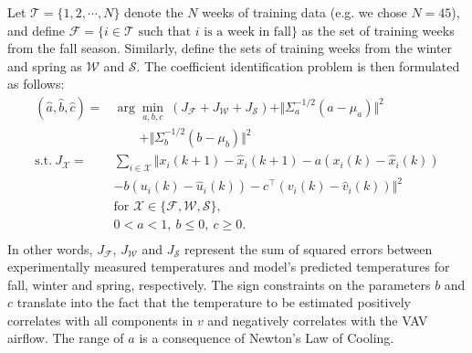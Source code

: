 Let $\mathcal{T} = \{1, 2, \cdots, N\}$ denote the $N$ weeks of training data (e.g. we chose $N = 45$), and define $\mathcal{F} = \{i \in \mathcal{T} \text{ such that $i$ is a week in fall} \}$ as the set of training weeks from the fall season. Similarly, define the sets of training weeks from the winter and spring as $\mathcal{W}$ and $\mathcal{S}$.
The coefficient identification problem is then formulated as follows:
\begin{equation}\label{eq:data_opt}
\begin{aligned}
(\hat{a}, \hat{b} , \hat{c}) = &\arg\min_{a, b, c}~\left(J_\mathcal{F} + J_\mathcal{W} + J_\mathcal{S}\right) + \Vert \Sigma_a^{-1/2} (a - \mu_a) \Vert^2\\
& \quad\quad + \Vert \Sigma_b^{-1/2} (b - \mu_b)  \Vert^2 \\
\text{s.t.}~ J_\mathcal{X}= & \textstyle \sum_{i \in \mathcal{X}} \Vert x_i(k+1) - \hat{x}_i(k+1) - a\left( x_i(k) - \hat{x}_i(k) \right)\\
& - b\left( u_i(k) - \hat{u}_i(k) \right) - {c}^\top\left( v_i(k) - \hat{v}_i(k) \right) \Vert ^ 2\\
& \text{for } \mathcal{X} \in \lbrace \mathcal{F}, \mathcal{W}, \mathcal{S} \rbrace, \\
& 0 < a < 1,~ b \leq 0,~ c \geq 0. \\
\end{aligned}
\end{equation}
In other words, $J_\mathcal{F}$, $J_\mathcal{W}$ and $J_\mathcal{S}$ represent the sum of squared errors between experimentally measured temperatures and model's predicted temperatures for fall, winter and spring, respectively.
The sign constraints on the parameters $b$ and $c$ translate into the fact that the temperature to be estimated positively correlates with all components in $v$ and negatively correlates with the VAV airflow. The range of $a$ is a consequence of Newton's Law of Cooling.
